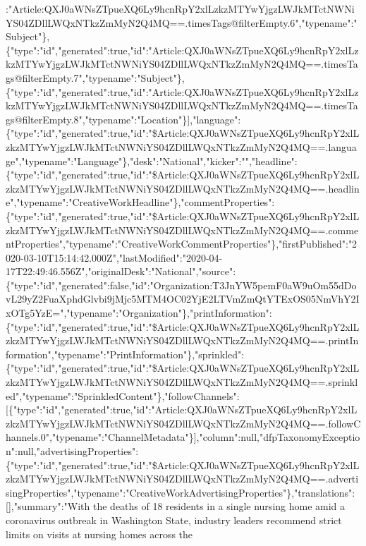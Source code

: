 :"Article:QXJ0aWNsZTpueXQ6Ly9hcnRpY2xlLzkzMTYwYjgzLWJkMTctNWNiYS04ZDllLWQxNTkzZmMyN2Q4MQ==.timesTags@filterEmpty.6","typename":"Subject"\},\{"type":"id","generated":true,"id":"Article:QXJ0aWNsZTpueXQ6Ly9hcnRpY2xlLzkzMTYwYjgzLWJkMTctNWNiYS04ZDllLWQxNTkzZmMyN2Q4MQ==.timesTags@filterEmpty.7","typename":"Subject"\},\{"type":"id","generated":true,"id":"Article:QXJ0aWNsZTpueXQ6Ly9hcnRpY2xlLzkzMTYwYjgzLWJkMTctNWNiYS04ZDllLWQxNTkzZmMyN2Q4MQ==.timesTags@filterEmpty.8","typename":"Location"\}{]},"language":\{"type":"id","generated":true,"id":"\$Article:QXJ0aWNsZTpueXQ6Ly9hcnRpY2xlLzkzMTYwYjgzLWJkMTctNWNiYS04ZDllLWQxNTkzZmMyN2Q4MQ==.language","typename":"Language"\},"desk":"National","kicker":"","headline":\{"type":"id","generated":true,"id":"\$Article:QXJ0aWNsZTpueXQ6Ly9hcnRpY2xlLzkzMTYwYjgzLWJkMTctNWNiYS04ZDllLWQxNTkzZmMyN2Q4MQ==.headline","typename":"CreativeWorkHeadline"\},"commentProperties":\{"type":"id","generated":true,"id":"\$Article:QXJ0aWNsZTpueXQ6Ly9hcnRpY2xlLzkzMTYwYjgzLWJkMTctNWNiYS04ZDllLWQxNTkzZmMyN2Q4MQ==.commentProperties","typename":"CreativeWorkCommentProperties"\},"firstPublished":"2020-03-10T15:14:42.000Z","lastModified":"2020-04-17T22:49:46.556Z","originalDesk":"National","source":\{"type":"id","generated":false,"id":"Organization:T3JnYW5pemF0aW9uOm55dDovL29yZ2FuaXphdGlvbi9jMjc5MTM4OC02YjE2LTVmZmQtYTExOS05NmVhY2IxOTg5YzE=","typename":"Organization"\},"printInformation":\{"type":"id","generated":true,"id":"\$Article:QXJ0aWNsZTpueXQ6Ly9hcnRpY2xlLzkzMTYwYjgzLWJkMTctNWNiYS04ZDllLWQxNTkzZmMyN2Q4MQ==.printInformation","typename":"PrintInformation"\},"sprinkled":\{"type":"id","generated":true,"id":"\$Article:QXJ0aWNsZTpueXQ6Ly9hcnRpY2xlLzkzMTYwYjgzLWJkMTctNWNiYS04ZDllLWQxNTkzZmMyN2Q4MQ==.sprinkled","typename":"SprinkledContent"\},"followChannels":{[}\{"type":"id","generated":true,"id":"Article:QXJ0aWNsZTpueXQ6Ly9hcnRpY2xlLzkzMTYwYjgzLWJkMTctNWNiYS04ZDllLWQxNTkzZmMyN2Q4MQ==.followChannels.0","typename":"ChannelMetadata"\}{]},"column":null,"dfpTaxonomyException":null,"advertisingProperties":\{"type":"id","generated":true,"id":"\$Article:QXJ0aWNsZTpueXQ6Ly9hcnRpY2xlLzkzMTYwYjgzLWJkMTctNWNiYS04ZDllLWQxNTkzZmMyN2Q4MQ==.advertisingProperties","typename":"CreativeWorkAdvertisingProperties"\},"translations":{[}{]},"summary":"With
the deaths of 18 residents in a single nursing home amid a coronavirus
outbreak in Washington State, industry leaders recommend strict limits
on visits at nursing homes across the
